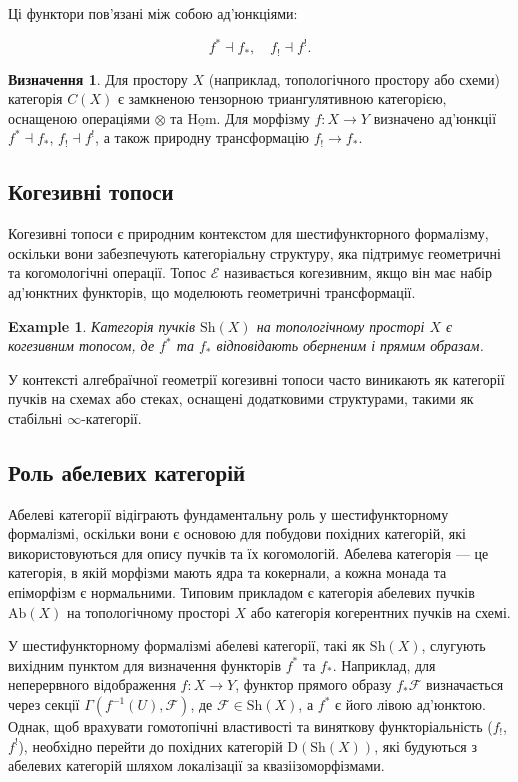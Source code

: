 \documentclass{article}
\theoremstyle{plain}
\newtheorem{example}{Example}
\theoremstyle{definition}
\newtheorem{definition}{Визначення}[section]
\begin{document}
Ці функтори пов’язані між собою ад’юнкціями:

\[
f^* \dashv f_*, \quad f_! \dashv f^!.
\]

\begin{definition}
Для простору \( X \) (наприклад, топологічного простору або схеми) категорія \( C(X) \) є замкненою тензорною триангулятивною категорією, оснащеною операціями \( \otimes \) та \( \underline{\mathrm{Hom}} \). Для морфізму \( f: X \to Y \) визначено ад’юнкції \( f^* \dashv f_* \), \( f_! \dashv f^! \), а також природну трансформацію \( f_! \to f_* \).
\end{definition}

\subsection{Когезивні топоси}

Когезивні топоси є природним контекстом для шестифункторного формалізму, оскільки вони забезпечують категоріальну структуру, яка підтримує геометричні та когомологічні операції. Топос \( \mathcal{E} \) називається когезивним, якщо він має набір ад’юнктних функторів, що моделюють геометричні трансформації.

\begin{example}
Категорія пучків \( \mathrm{Sh}(X) \) на топологічному просторі \( X \) є когезивним топосом, де \( f^* \) та \( f_* \) відповідають оберненим і прямим образам.
\end{example}

У контексті алгебраїчної геометрії когезивні топоси часто виникають як категорії пучків на схемах або стеках, оснащені додатковими структурами, такими як стабільні \(\infty\)-категорії.

\subsection{Роль абелевих категорій}

Абелеві категорії відіграють фундаментальну роль у шестифункторному формалізмі,
оскільки вони є основою для побудови похідних категорій, які використовуються
для опису пучків та їх когомологій. Абелева категорія — це категорія,
в якій морфізми мають ядра та кокернали, а кожна монада та епіморфізм є нормальними.
Типовим прикладом є категорія абелевих пучків \( \mathrm{Ab}(X) \) на
топологічному просторі \( X \) або категорія когерентних пучків на схемі.

У шестифункторному формалізмі абелеві категорії, такі як \( \mathrm{Sh}(X) \),
слугують вихідним пунктом для визначення функторів \( f^* \) та \( f_* \).
Наприклад, для неперервного відображення \( f: X \to Y \), функтор прямого
образу \( f_* \mathscr{F} \) визначається через секції \( \Gamma(f^{-1}(U), \mathscr{F}) \),
де \( \mathscr{F} \in \mathrm{Sh}(X) \), а \( f^* \) є його лівою ад’юнктою. Однак, щоб врахувати гомотопічні властивості та виняткову функторіальність (\( f_! \), \( f^! \)), необхідно перейти до похідних категорій \( \mathrm{D}(\mathrm{Sh}(X)) \), які будуються з абелевих категорій шляхом локалізації за квазіізоморфізмами.
\end{document}
